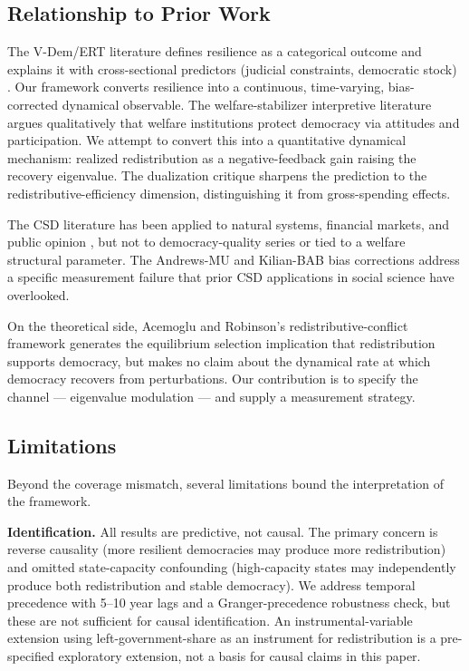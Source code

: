 \documentclass[11pt,letterpaper]{article}
\begin{document}
\subsection{Relationship to Prior Work}

The V-Dem/ERT literature defines resilience as a categorical outcome and explains it with cross-sectional predictors
(judicial constraints, democratic stock) \citep{Boese2021,Luhrmann2019}. Our framework converts resilience into a
continuous, time-varying, bias-corrected dynamical observable. The welfare-stabilizer interpretive literature
\citep{Kumlin2014} argues qualitatively that welfare institutions protect democracy via attitudes and participation. We
attempt to convert this into a quantitative dynamical mechanism: realized redistribution as a negative-feedback gain
raising the recovery eigenvalue. The dualization critique \citep{Lindvall2014,Emmenegger2012} sharpens the prediction
to the redistributive-efficiency dimension, distinguishing it from gross-spending effects.

The CSD literature \citep{Scheffer2009,Scheffer2012,Carpenter2011,Dakos2008,Dakos2012} has been applied to natural
systems, financial markets, and public opinion \citep{Tan2016,Guttal2016}, but not to democracy-quality series or tied
to a welfare structural parameter. The Andrews-MU and Kilian-BAB bias corrections \citep{Andrews1993,Kilian1998}
address a specific measurement failure that prior CSD applications in social science have overlooked.

On the theoretical side, Acemoglu and Robinson's redistributive-conflict framework \citep{Acemoglu2006,Acemoglu2000}
generates the equilibrium selection implication that redistribution supports democracy, but makes no claim about the
dynamical rate at which democracy recovers from perturbations. Our contribution is to specify the channel --- eigenvalue
modulation --- and supply a measurement strategy.

\subsection{Limitations}

Beyond the coverage mismatch, several limitations bound the interpretation of the framework.

\textbf{Identification.} All results are predictive, not causal. The primary concern is reverse causality (more
resilient democracies may produce more redistribution) and omitted state-capacity confounding (high-capacity states may
independently produce both redistribution and stable democracy). We address temporal precedence with 5--10 year lags and
a Granger-precedence robustness check, but these are not sufficient for causal identification. An instrumental-variable
extension using left-government-share as an instrument for redistribution is a pre-specified exploratory extension, not
a basis for causal claims in this paper.
\end{document}
